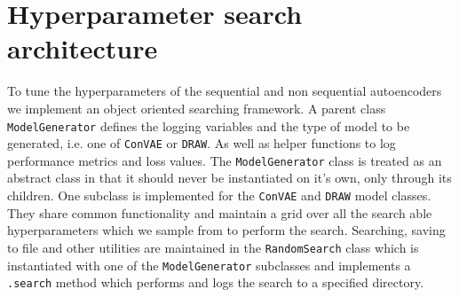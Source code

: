 \section{Hyperparameter search architecture}\label{sec:hyperparam_search_arch}

To tune the hyperparameters of the sequential and non sequential autoencoders we implement an object oriented searching framework. A parent class \lstinline{ModelGenerator} defines the logging variables and the type of model to be generated, i.e. one of \lstinline{ConVAE} or \lstinline{DRAW}. As well as helper functions to log performance metrics and loss values. The \lstinline{ModelGenerator} class is treated as an abstract class in that it should never be instantiated on it's own, only through its children. One subclass is implemented for the \lstinline{ConVAE} and \lstinline{DRAW} model classes. They share common functionality and maintain a grid over all the search able hyperparameters which we sample from to perform the search. Searching, saving to file and other utilities are maintained in the \lstinline{RandomSearch} class which is instantiated with one of the \lstinline{ModelGenerator} subclasses and implements a \lstinline{.search} method which performs and logs the search to a specified directory. 